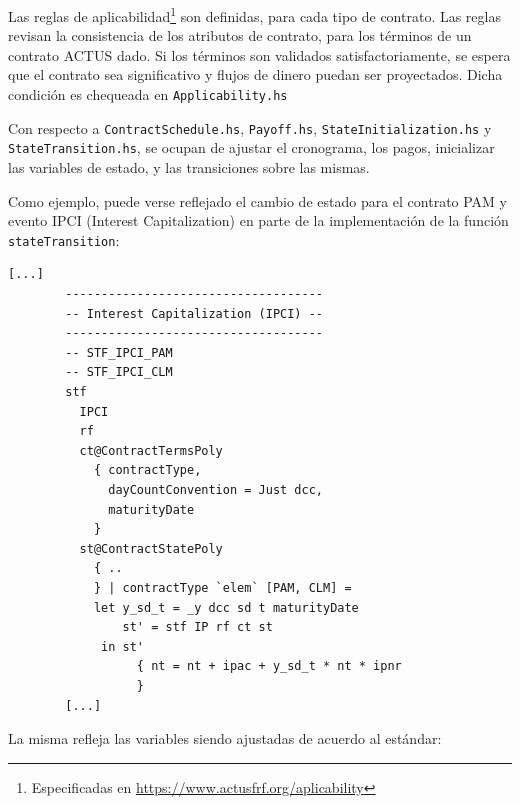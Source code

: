 \documentclass[12pt]{book}
\begin{document}

Las reglas de aplicabilidad\footnote{Especificadas en \href{https://www.actusfrf.org/aplicability}{https://www.actusfrf.org/aplicability}} son definidas, para cada tipo de contrato. Las reglas revisan la consistencia de los atributos de contrato, para los términos de un contrato ACTUS dado. Si los términos son validados satisfactoriamente, se espera que el contrato sea significativo y flujos de dinero puedan ser proyectados. Dicha condición es chequeada en \texttt{Applicability.hs}

Con respecto a \texttt{ContractSchedule.hs}, \texttt{Payoff.hs}, \texttt{StateInitialization.hs} y\\ \texttt{StateTransition.hs}, se ocupan de ajustar el cronograma, los pagos, inicializar las variables de estado, y las transiciones sobre las mismas.

Como ejemplo, puede verse reflejado el cambio de estado para el contrato PAM y evento IPCI (Interest Capitalization) en parte de la implementación de la función \texttt{stateTransition}:

\begin{lstlisting}[style=Haskell-cardano, caption=Parte de la función que modela la transicción de estados.]
        [...]
        ------------------------------------
        -- Interest Capitalization (IPCI) --
        ------------------------------------
        -- STF_IPCI_PAM
        -- STF_IPCI_CLM
        stf
          IPCI
          rf
          ct@ContractTermsPoly
            { contractType,
              dayCountConvention = Just dcc,
              maturityDate
            }
          st@ContractStatePoly
            { ..
            } | contractType `elem` [PAM, CLM] =
            let y_sd_t = _y dcc sd t maturityDate
                st' = stf IP rf ct st
             in st'
                  { nt = nt + ipac + y_sd_t * nt * ipnr
                  }
        [...]
\end{lstlisting}

La misma refleja las variables siendo ajustadas de acuerdo al estándar:

\begingroup
\fontsize{9pt}{9pt}\selectfont
\end{document}
